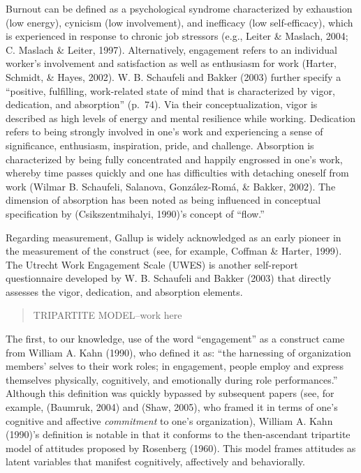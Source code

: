 \documentclass[
  english,
  man]{apa6}
\begin{document}
Burnout can be defined as a psychological syndrome characterized by exhaustion (low energy), cynicism (low involvement), and inefficacy (low self-efficacy), which is experienced in response to chronic job stressors (e.g., Leiter \& Maslach, 2004; C. Maslach \& Leiter, 1997). Alternatively, engagement refers to an individual worker's involvement and satisfaction as well as enthusiasm for work (Harter, Schmidt, \& Hayes, 2002). W. B. Schaufeli and Bakker (2003) further specify a ``positive, fulfilling, work-related state of mind that is characterized by vigor, dedication, and absorption'' (p.~74). Via their conceptualization, vigor is described as high levels of energy and mental resilience while working. Dedication refers to being strongly involved in one's work and experiencing a sense of significance, enthusiasm, inspiration, pride, and challenge. Absorption is characterized by being fully concentrated and happily engrossed in one's work, whereby time passes quickly and one has difficulties with detaching oneself from work (Wilmar B. Schaufeli, Salanova, González-Romá, \& Bakker, 2002). The dimension of absorption has been noted as being influenced in conceptual specification by (Csikszentmihalyi, 1990)'s concept of ``flow.''

Regarding measurement, Gallup is widely acknowledged as an early pioneer in the measurement of the construct (see, for example, Coffman \& Harter, 1999). The Utrecht Work Engagement Scale (UWES) is another self-report questionnaire developed by W. B. Schaufeli and Bakker (2003) that directly assesses the vigor, dedication, and absorption elements.

\begin{quote}
TRIPARTITE MODEL--work here
\end{quote}

The first, to our knowledge, use of the word ``engagement'' as a construct came from William A. Kahn (1990), who defined it as: ``the harnessing of organization members' selves to their work roles; in engagement, people employ and express themselves physically, cognitively, and emotionally during role performances.'' Although this definition was quickly bypassed by subsequent papers (see, for example, (Baumruk, 2004) and (Shaw, 2005), who framed it in terms of one's cognitive and affective \emph{commitment} to one's organization), William A. Kahn (1990)'s definition is notable in that it conforms to the then-ascendant tripartite model of attitudes proposed by Rosenberg (1960). This model frames attitudes as latent variables that manifest cognitively, affectively and behaviorally.
\end{document}
